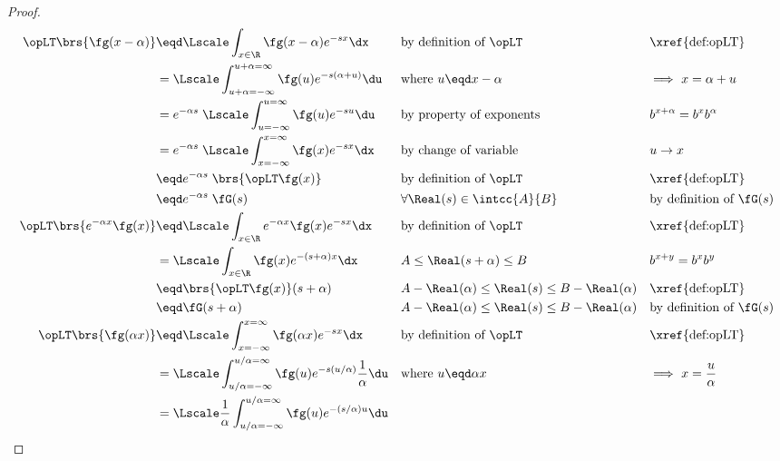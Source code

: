 \begin{proof}
\begin{align*}
  \opLT\brs{\fg(x-\alpha)}
    &\eqd \Lscale \int_{x\in\R} \fg(x-\alpha) e^{-sx} \dx                               && \text{by definition of $\opLT$} && \text{\xref{def:opLT}}
  \\&=    \Lscale \int_{u+\alpha=-\infty}^{u+\alpha=\infty} \fg(u) e^{-s(\alpha+u)} \du && \text{where $u\eqd x-\alpha$}   && \text{$\implies$ $x=\alpha+u$}
  \\&=    e^{-\alpha s} \;\Lscale \int_{u=-\infty}^{u=\infty} \fg(u) e^{-su} \du        && \text{by property of exponents} && \text{$b^{x+\alpha}=b^xb^\alpha$}
  \\&=    e^{-\alpha s} \;\Lscale \int_{x=-\infty}^{x=\infty} \fg(x) e^{-sx} \dx        && \text{by change of variable}    && \text{$u\to x$}
  \\&\eqd e^{-\alpha s} \;\brs{\opLT \fg(x)}                                            && \text{by definition of $\opLT$} && \text{\xref{def:opLT}}
  \\&\eqd e^{-\alpha s} \;\fG(s)                                                        && \forall \Real(s)\in\intcc{A}{B} && \text{by definition of $\fG(s)$}
  \\
  \opLT\brs{e^{-\alpha x} \fg(x)}
    &\eqd \Lscale \int_{x\in\R} e^{-\alpha x} \fg(x) e^{-sx} \dx   && \text{by definition of $\opLT$}                 && \text{\xref{def:opLT}}
  \\&=    \Lscale \int_{x\in\R} \fg(x) e^{-(s+\alpha)x} \dx        && A\leq\Real(s+\alpha)\leq B                      && \text{$b^{x+y} = b^x b^y$}
  \\&\eqd \brs{\opLT\fg(x)}(s+\alpha)                              && A-\Real(\alpha)\leq\Real(s)\leq B-\Real(\alpha) && \text{\xref{def:opLT}}
  \\&\eqd \fG(s+\alpha)                                            && A-\Real(\alpha)\leq\Real(s)\leq B-\Real(\alpha) && \text{by definition of $\fG(s)$}
  \\
  \opLT\brs{\fg(\alpha x)}
    &\eqd \Lscale \int_{x=-\infty}^{x=\infty} \fg(\alpha x) e^{-sx} \dx             
    && \text{by definition of $\opLT$} 
    && \text{\xref{def:opLT}}
  \\&=    \Lscale \int_{u/\alpha=-\infty}^{u/\alpha=\infty} \fg(u) e^{-s(u/\alpha)} \frac{1}{\alpha}\du && \text{where $u\eqd \alpha x$}   && \text{$\implies$ $x=\frac{u}{\alpha}$}
  \\&=    \Lscale \frac{1}{\alpha}\int_{u/\alpha=-\infty}^{u/\alpha=\infty} \fg(u) e^{-(s/\alpha)u} \du 

\end{align*}
\end{proof}
